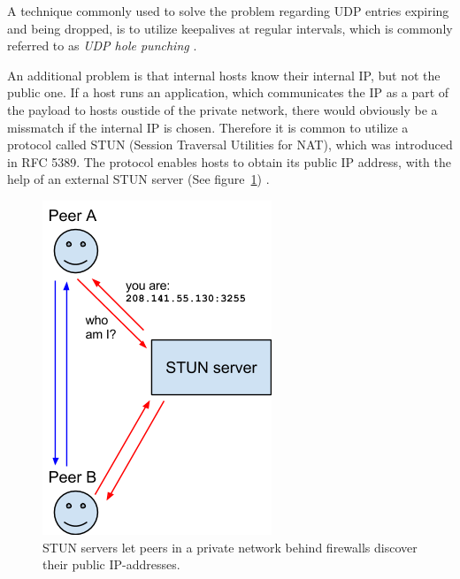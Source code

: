 A technique commonly used to solve the problem regarding UDP entries expiring and being dropped, is to utilize keepalives at regular intervals, which is commonly referred to as \emph{UDP hole punching} \cite{UDPHolePunching:Online}.

An additional problem is that internal hosts know their internal IP, but not the public one. If a host runs an application, which communicates the IP as a part of the payload to hosts oustide of the private network, there would obviously be a missmatch if the internal IP is chosen. Therefore it is common to utilize a protocol called STUN (Session Traversal Utilities for NAT), which was introduced in RFC 5389. The protocol enables hosts to obtain its public IP address, with the help of an external STUN server (See figure~\ref{fig:WebRTC - STUN}) \cite{RFC5389:Online}.

\begin{figure}[htp]
\centering
\includegraphics[width=\textwidth,height=0.2\paperheight,keepaspectratio
]{figures/webrtc-stun}
\caption{STUN servers let peers in a private network behind firewalls discover their public IP-addresses\cite{WebRTCArchitecture:2014:Online}.}
\label{fig:WebRTC - STUN}
\end{figure}

